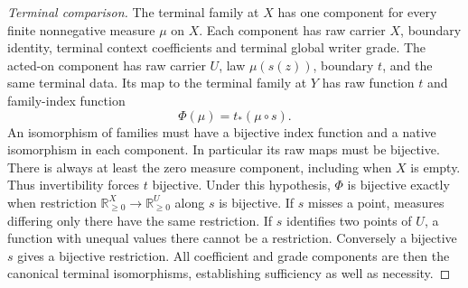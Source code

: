 \documentclass{article}
\begin{document}
\begin{proof}[Terminal comparison]
The terminal family at $X$ has one component for every finite nonnegative
measure $\mu$ on $X$. Each component has raw carrier $X$, boundary identity,
terminal context coefficients and terminal global writer grade. The acted-on
component has raw carrier $U$, law $\mu(s(z))$, boundary $t$, and the same
terminal data. Its map to the terminal family at $Y$ has raw function $t$ and
family-index function
\[
 \Phi(\mu)=t_*(\mu\circ s).
\]
An isomorphism of families must have a bijective index function and a native
isomorphism in each component. In particular its raw maps must be bijective.
There is always at least the zero measure component, including when $X$ is
empty. Thus invertibility forces $t$ bijective. Under this hypothesis,
$\Phi$ is bijective exactly when restriction
$\mathbb R_{\ge0}^X\to\mathbb R_{\ge0}^U$ along $s$ is bijective. If $s$
misses a point, measures differing only there have the same restriction. If
$s$ identifies two points of $U$, a function with unequal values there cannot
be a restriction. Conversely a bijective $s$ gives a bijective restriction.
All coefficient and grade components are then the canonical terminal
isomorphisms, establishing sufficiency as well as necessity.
\end{proof}
\end{document}

